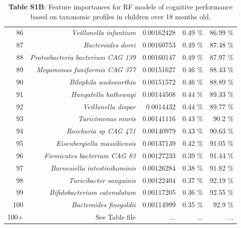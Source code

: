 \documentclass{article}
\begin{document}
\begin{table}[h]
\begin{centering}
\begin{tabular}{|r|r|r|r|r|}
      86 & \textit{Veillonella infantium} & 0.00162428 & 0.49 \% & 86.99 \% \\
      87 & \textit{Bacteroides dorei} & 0.00160753 & 0.49 \% & 87.48 \% \\
      88 & \textit{Proteobacteria bacterium CAG 139} & 0.00160147 & 0.49 \% & 87.97 \% \\
      89 & \textit{Megamonas funiformis CAG 377} & 0.00151627 & 0.46 \% & 88.43 \% \\
      90 & \textit{Bilophila wadsworthia} & 0.00151572 & 0.46 \% & 88.89 \% \\
      91 & \textit{Hungatella hathewayi} & 0.00144508 & 0.44 \% & 89.33 \% \\
      92 & \textit{Veillonella dispar} & 0.0014432 & 0.44 \% & 89.77 \% \\
      93 & \textit{Turicimonas muris} & 0.00141116 & 0.43 \% & 90.2 \% \\
      94 & \textit{Roseburia sp CAG 471} & 0.00140979 & 0.43 \% & 90.63 \% \\
      95 & \textit{Eisenbergiella massiliensis} & 0.00137139 & 0.42 \% & 91.05 \% \\
      96 & \textit{Firmicutes bacterium CAG 83} & 0.00127233 & 0.39 \% & 91.44 \% \\
      97 & \textit{Barnesiella intestinihominis} & 0.00126284 & 0.38 \% & 91.82 \% \\
      98 & \textit{Turicibacter sanguinis} & 0.00122404 & 0.37 \% & 92.19 \% \\
      99 & \textit{Bifidobacterium catenulatum} & 0.00117205 & 0.36 \% & 92.55 \% \\
      100 & \textit{Bacteroides finegoldii} & 0.00114999 & 0.35 \% & 92.9 \% \\
      100+ & See Table file & ... & ... & ... \\\hline\hline

    \end{tabular}
    \caption*{
        \textbf{Table S1B}: Feature importances for RF models of cognitive performance
        based on taxonomic profiles in children over 18 months old.
    }
    \end{centering}
  \end{table}
\end{document}
